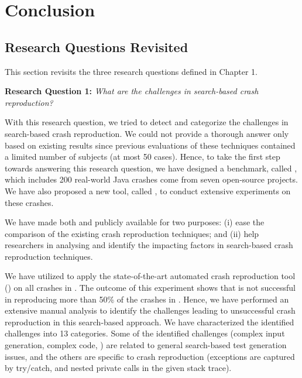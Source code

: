 \chapter{Conclusion}
\label{conclusion}

\section{Research Questions Revisited}

This section revisits the three research questions defined in Chapter 1.


\textbf{Research Question 1: }\textit{What are the challenges in search-based crash reproduction?}

With this research question, we tried to detect and categorize the challenges in search-based crash reproduction. 
We could not provide a thorough answer only based on existing results since previous evaluations of these techniques contained a limited number of subjects (at most 50 cases). Hence, to take the first step towards answering this research question, we have designed a benchmark, called \crashpack, which includes 200 real-world Java crashes come from seven open-source projects. We have also proposed a new tool, called \exrunner, to conduct extensive experiments on these crashes.

We have made both \crashpack and \exrunner publicly available for two purposes: 
(i) ease the comparison of the existing crash reproduction techniques; and 
(ii) help researchers in analysing and identify the impacting factors in search-based crash reproduction techniques.

We have utilized \exrunner to apply the state-of-the-art automated crash reproduction tool (\evocrash) on all crashes in \jcrashpack. The outcome of this experiment shows that \evocrash is not successful in reproducing more than 50\% of the crashes in \jcrashpack. Hence, we have performed an extensive manual analysis to identify the challenges leading to unsuccessful crash reproduction in this search-based approach. We have characterized the identified challenges into 13 categories. Some of the identified challenges (\eg complex input generation, complex code, \etc) are related to general search-based test generation issues, and the others are specific to crash reproduction (\eg exceptions are captured by try/catch, and nested private calls in the given stack trace).


